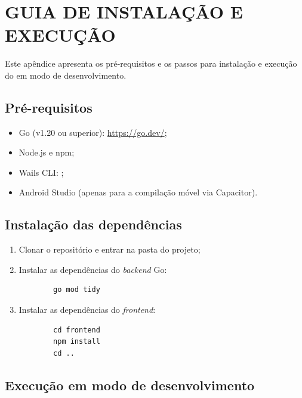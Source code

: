 
\chapter{GUIA DE INSTALAÇÃO E EXECUÇÃO}
\label{ap:instalacao}

Este apêndice apresenta os pré-requisitos e os passos para instalação e
execução do \argus{} em modo de desenvolvimento.

\section{Pré-requisitos}
\label{ap:instalacao-pre-requisitos}

\begin{itemize}
    \item Go (v1.20 ou superior): \url{https://go.dev/};
    \item Node.js e npm;
    \item Wails CLI: ;
    \item Android Studio (apenas para a compilação móvel via Capacitor).
\end{itemize}

\section{Instalação das dependências}
\label{ap:instalacao-dependencias}

\begin{enumerate}
    \item Clonar o repositório e entrar na pasta do projeto;
    \item Instalar as dependências do \textit{backend} Go:
        \begin{verbatim}
        go mod tidy
        \end{verbatim}
    \item Instalar as dependências do \textit{frontend}:
        \begin{verbatim}
        cd frontend
        npm install
        cd ..
        \end{verbatim}
\end{enumerate}

\section{Execução em modo de desenvolvimento}
\label{ap:instalacao-execucao}

